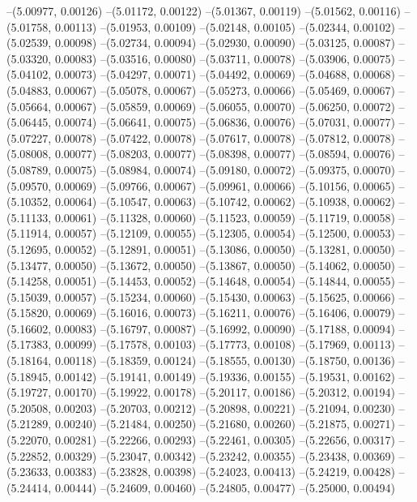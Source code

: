--(5.00977, 0.00126)
--(5.01172, 0.00122)
--(5.01367, 0.00119)
--(5.01562, 0.00116)
--(5.01758, 0.00113)
--(5.01953, 0.00109)
--(5.02148, 0.00105)
--(5.02344, 0.00102)
--(5.02539, 0.00098)
--(5.02734, 0.00094)
--(5.02930, 0.00090)
--(5.03125, 0.00087)
--(5.03320, 0.00083)
--(5.03516, 0.00080)
--(5.03711, 0.00078)
--(5.03906, 0.00075)
--(5.04102, 0.00073)
--(5.04297, 0.00071)
--(5.04492, 0.00069)
--(5.04688, 0.00068)
--(5.04883, 0.00067)
--(5.05078, 0.00067)
--(5.05273, 0.00066)
--(5.05469, 0.00067)
--(5.05664, 0.00067)
--(5.05859, 0.00069)
--(5.06055, 0.00070)
--(5.06250, 0.00072)
--(5.06445, 0.00074)
--(5.06641, 0.00075)
--(5.06836, 0.00076)
--(5.07031, 0.00077)
--(5.07227, 0.00078)
--(5.07422, 0.00078)
--(5.07617, 0.00078)
--(5.07812, 0.00078)
--(5.08008, 0.00077)
--(5.08203, 0.00077)
--(5.08398, 0.00077)
--(5.08594, 0.00076)
--(5.08789, 0.00075)
--(5.08984, 0.00074)
--(5.09180, 0.00072)
--(5.09375, 0.00070)
--(5.09570, 0.00069)
--(5.09766, 0.00067)
--(5.09961, 0.00066)
--(5.10156, 0.00065)
--(5.10352, 0.00064)
--(5.10547, 0.00063)
--(5.10742, 0.00062)
--(5.10938, 0.00062)
--(5.11133, 0.00061)
--(5.11328, 0.00060)
--(5.11523, 0.00059)
--(5.11719, 0.00058)
--(5.11914, 0.00057)
--(5.12109, 0.00055)
--(5.12305, 0.00054)
--(5.12500, 0.00053)
--(5.12695, 0.00052)
--(5.12891, 0.00051)
--(5.13086, 0.00050)
--(5.13281, 0.00050)
--(5.13477, 0.00050)
--(5.13672, 0.00050)
--(5.13867, 0.00050)
--(5.14062, 0.00050)
--(5.14258, 0.00051)
--(5.14453, 0.00052)
--(5.14648, 0.00054)
--(5.14844, 0.00055)
--(5.15039, 0.00057)
--(5.15234, 0.00060)
--(5.15430, 0.00063)
--(5.15625, 0.00066)
--(5.15820, 0.00069)
--(5.16016, 0.00073)
--(5.16211, 0.00076)
--(5.16406, 0.00079)
--(5.16602, 0.00083)
--(5.16797, 0.00087)
--(5.16992, 0.00090)
--(5.17188, 0.00094)
--(5.17383, 0.00099)
--(5.17578, 0.00103)
--(5.17773, 0.00108)
--(5.17969, 0.00113)
--(5.18164, 0.00118)
--(5.18359, 0.00124)
--(5.18555, 0.00130)
--(5.18750, 0.00136)
--(5.18945, 0.00142)
--(5.19141, 0.00149)
--(5.19336, 0.00155)
--(5.19531, 0.00162)
--(5.19727, 0.00170)
--(5.19922, 0.00178)
--(5.20117, 0.00186)
--(5.20312, 0.00194)
--(5.20508, 0.00203)
--(5.20703, 0.00212)
--(5.20898, 0.00221)
--(5.21094, 0.00230)
--(5.21289, 0.00240)
--(5.21484, 0.00250)
--(5.21680, 0.00260)
--(5.21875, 0.00271)
--(5.22070, 0.00281)
--(5.22266, 0.00293)
--(5.22461, 0.00305)
--(5.22656, 0.00317)
--(5.22852, 0.00329)
--(5.23047, 0.00342)
--(5.23242, 0.00355)
--(5.23438, 0.00369)
--(5.23633, 0.00383)
--(5.23828, 0.00398)
--(5.24023, 0.00413)
--(5.24219, 0.00428)
--(5.24414, 0.00444)
--(5.24609, 0.00460)
--(5.24805, 0.00477)
--(5.25000, 0.00494)
